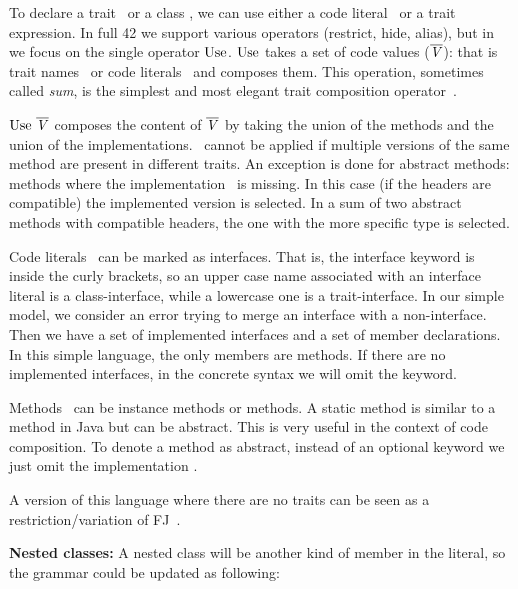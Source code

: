 \noindent To declare a trait \mTD\ or a class \mCD, we can use either a code literal \mL\ or a trait
expression.  In full 42 we support various operators (restrict, hide,
alias), but in \name we focus on the single operator 
$\use$. $\use$ takes a set
of code values ($\overline{\mathit{V}}$): that is trait names \mt\ or code literals \mL\ and composes them.  
This operation, sometimes called \emph{sum}, is the simplest and most elegant
trait composition operator~\cite{ducasse2006traits}.

$\use\ \overline\mV$ composes the content of $\overline{\mathit{V}}$
by taking the union of the methods and the union of the
implementations.
\use\ cannot be applied if multiple versions of the same method are
present in different traits.  An exception is done for abstract methods:
methods where the implementation \me\ is missing. In this case (if the
headers are compatible) the implemented version is selected.  In a sum
of two abstract methods with compatible headers, the one with the more
specific type is selected.

Code literals \mL\ can be marked as interfaces. 
That is, the interface keyword is inside the curly brackets, so an upper case name associated with an interface literal is a class-interface, while a lowercase one is a trait-interface.
In our simple model, we consider an error trying to merge an interface with a non-interface.
 Then we have a set of implemented interfaces and a set of member
  declarations. In this simple language, the only members are methods.
If there are no implemented interfaces, in the concrete syntax we will omit the \Q@implements@ keyword.

Methods \mMD~can be instance methods or \Q@static@ methods. A static method is similar to a \Q@static@ method in Java but can be abstract. This is very useful in the context of code composition.
To denote a method as abstract, instead of an optional keyword we just omit the implementation \me.

A version of this language where there are no traits can be seen 
as a restriction/variation of FJ~\cite{igarashi2001featherweight}.

\noindent\textbf{Nested classes:}
A nested class will be another kind of member in the literal, so  
the grammar could be updated as following:

\begin{bnf}
\prodFull{}\\
\prodFull{}
\end{bnf}\\


